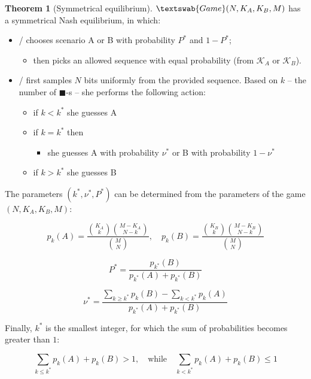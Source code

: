 \documentclass{article}
\newcommand{\bb}{\blacksquare}
\theoremstyle{definition}
\newtheorem{theorem}{Theorem}[section]
\newcommand{\G}[1]{$\textswab{Game}(#1)$}
\begin{document}
\begin{theorem}[Symmetrical equilibrium]
\label{thm:Symmetric}
\G{N,K_A,K_B,M} has a symmetrical Nash equilibrium, in which:

\begin{itemize}
    \item \PII/ chooses scenario A or B with probability $P^*$ and $1-P^*$;
    \begin{itemize}
        \item then picks an allowed sequence with equal probability (from $\mathcal{K}_A$ or $\mathcal{K}_B$).
    \end{itemize}

    \item \PI/ first samples $N$ bits uniformly from the provided sequence. Based on $k$ -- the number of $\bb$-s -- she performs the following action:
    \begin{itemize}
        \item if $k<k^*$ she guesses A
        \item if $k=k^*$ then 
        \begin{itemize}
            \item she guesses A with probability $\nu^*$ or B with probability $1-\nu^*$
        \end{itemize} 
        \item if $k>k^*$ she guesses B
    \end{itemize}
\end{itemize}

The parameters $(k^*, \nu^*, P^*)$ can be determined from the parameters of the game $(N, K_A, K_B, M)$:

\begin{equation}
    \label{thm:SymEqHypergeom}
    p_k(A) = \frac{\binom{K_A}{k} \binom{M-K_A}{N-k}}{\binom{M}{N}}, \quad
    p_k(B) = \frac{\binom{K_B}{k} \binom{M-K_B}{N-k}}{\binom{M}{N}}
\end{equation}

\begin{equation}
    \label{thm:Fisher_Ps}
    P^* = \frac{p_{k^*}(B)}{p_{k^*}(A)+p_{k^*}(B)}
\end{equation}

\begin{equation}
    \label{thm:SymEqNu}
    \nu^* = \frac{\sum_{k \ge k^*} p_k(B) - \sum_{k < k^*} p_k(A)}{p_{k^*}(A)+p_{k^*}(B)}
\end{equation}

Finally, $k^*$ is the smallest integer, for which the sum of probabilities becomes greater than $1$:

\begin{equation}
    \label{thm:Fisher_ks}
    \sum_{k \le k^*} p_k(A)+p_k(B) > 1, \quad \mathrm{while} \quad \sum_{k<k^*} p_k(A)+p_k(B) \le 1
\end{equation}

\end{theorem}
\end{document}
